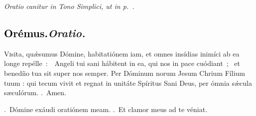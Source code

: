 \documentclass[12pt]{article} %
\newenvironment{rubric}{\vspace{1 mm}\color{benred8} \itshape \leftskip 0in \setlength{\parindent}{0.25in}}{\vspace{1 mm}}
\newenvironment{response}{\leftskip 0in \setlength{\parindent}{0in}}{\vspace{1 mm}}
\let\oldgresixstar\gresixstar
\renewcommand{\gresixstar}{\textcolor{benred8}{\oldgresixstar}}
\let\oldgredagger\gredagger
\renewcommand{\gredagger}{\textcolor{benred8}{\oldgredagger}}
\let\oldVbar\Vbar
\renewcommand{\Vbar}{\textcolor{benred8}{\oldVbar .}}
\let\oldRbar\Rbar
\renewcommand{\Rbar}{\textcolor{benred8}{\oldRbar .}}
\def\capitulumSpace{\hspace{20 mm}}
\begin{document}
\gresetfirstlineaboveinitial{\small \textsc{ \textbf{\textcolor{benred8}{\Vbar}}}}{\small \textsc{ \textbf{\textcolor{benred8}{\Vbar}}}}


\begin{rubric}
Oratio canitur in Tono Simplici, ut in p.~\pageref{OratioSimplex}.

\end{rubric}

\subsection*{\textcolor{black}{Or\'{e}mus.}\capitulumSpace \emph{Oratio.}}

\begin{response}\lettrine{V}{i}sita, qu\'{\ae}sumus D\'{o}mine, habitati\'{o}nem iam, et omnes ins\'{i}dias inim\'{i}ci ab ea longe rep\'{e}lle~:~\gredagger\ Angeli tui sani h\'{a}bitent in ea, qui nos in pace cu\'{o}diant~; \gresixstar\ et bened\'{i}io tua sit super nos semper. Per D\'{o}minum norum Jesum Chrium F\'{i}lium tuum : qui tecum vivit et regnat in unit\'{a}te Sp\'{i}ritus Sani Deus, per \'{o}mnia s\'{\ae}cula s\ae cul\'{o}rum. \Rbar\ Amen.

\end{response}

\begin{response}
\Vbar\ Dómine exáudi oratiónem meam. \Rbar\ Et clamor meus ad te véniat.

\end{response}

\vspace{1.5mm}

\gresetfirstlineaboveinitial{\small \textsc{ \textbf{\textcolor{benred8}{II}}}}{\small \textsc{ \textbf{\textcolor{benred8}{II}}}}

%
%
%
%
%
\end{document}
